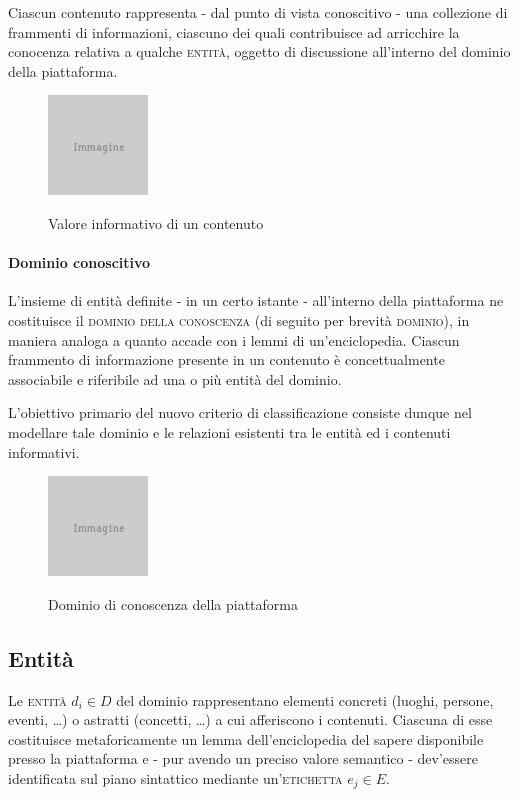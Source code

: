 Ciascun contenuto rappresenta - dal punto di vista conoscitivo - una collezione di frammenti di informazioni, ciascuno dei quali contribuisce ad arricchire la conocenza relativa a qualche \textsc{entità}, oggetto di discussione all'interno del dominio della piattaforma.

\begin{figure}[ht]
\begin{center}
 \includegraphics{placeholder.png}
 \label{fig:tesi:stage:fase-uno:contenuti-informativi}
 \caption{Valore informativo di un contenuto}
\end{center}
\end{figure}

\paragraph{Dominio conoscitivo}
L'insieme di entità definite - in un certo istante - all'interno della piattaforma ne costituisce il \textsc{dominio della conoscenza} (di seguito per brevità \textsc{dominio}), in maniera analoga a quanto accade con i lemmi di un'enciclopedia. Ciascun frammento di informazione presente in un contenuto è concettualmente associabile e riferibile ad una o più entità del dominio.

L'obiettivo primario del nuovo criterio di classificazione consiste dunque nel modellare tale dominio e le relazioni esistenti tra le entità ed i contenuti informativi.

\begin{figure}[ht]
\begin{center}
 \includegraphics{placeholder.png}
 \label{fig:tesi:stage:fase-uno:dominio-conoscenza}
 \caption{Dominio di conoscenza della piattaforma}
\end{center}
\end{figure}

\subsection{Entità}  
Le \textsc{entità} $d_i \in D$ del dominio rappresentano elementi concreti (luoghi, persone, eventi, \ldots) o astratti (concetti, \ldots) a cui afferiscono i contenuti. Ciascuna di esse costituisce metaforicamente un lemma dell'enciclopedia del sapere disponibile presso la piattaforma e - pur avendo un preciso valore semantico - dev'essere identificata sul piano sintattico mediante un'\textsc{etichetta} $e_j \in E$.

